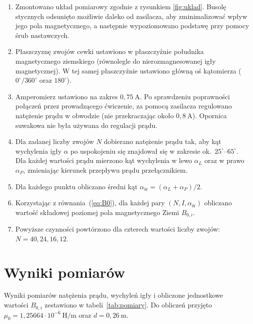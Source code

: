 \documentclass{fizykalab}
\begin{document}
\begin{enumerate}
  \item Zmontowano układ pomiarowy zgodnie z rysunkiem
    \ref{fig:uklad}. Busolę stycznych odsunięto możliwie
    daleko od zasilacza, aby zminimalizować wpływ jego
    pola magnetycznego, a następnie wypoziomowano podstawę
    przy pomocy śrub nastawczych.
  \item Płaszczyznę zwojów cewki ustawiono w płaszczyźnie
    południka magnetycznego ziemskiego (równolegle do
    nierozmagnesowanej igły magnetycznej). W tej samej
    płaszczyźnie ustawiono główną oś kątomierza
    (\(0^\circ/360^\circ\) oraz \(180^\circ\)).
  \item Amperomierz ustawiono na zakres \(0{,}75~\text{A}\).
    Po sprawdzeniu poprawności połączeń przez prowadzącego
    ćwiczenie, za pomocą zasilacza regulowano natężenie
    prądu w obwodzie (nie przekraczając około \(0{,}8~\text{A}\)).
    Opornica suwakowa nie była używana do regulacji prądu.
  \item Dla zadanej liczby zwojów \(N\) dobierano natężenie
    prądu tak, aby kąt wychylenia igły \(\alpha\) po
    uspokojeniu się znajdował się w zakresie
    ok.~\(25^\circ\)–\(65^\circ\). Dla każdej wartości prądu
    mierzono kąt wychylenia w lewo \(\alpha_L\) oraz w prawo
    \(\alpha_P\), zmieniając kierunek przepływu prądu
    przełącznikiem.
  \item Dla każdego punktu obliczano średni kąt
    \(\alpha_{\text{śr}} = (\alpha_L + \alpha_P)/2\).
  \item Korzystając z równania~(\ref{eq:B0}), dla każdej pary
    \((N, I, \alpha_{\text{śr}})\) obliczano wartość
    składowej poziomej pola magnetycznego Ziemi \(B_{0,i}\).
  \item Powyższe czynności powtórzono dla czterech wartości
    liczby zwojów: \(N = 40, 24, 16, 12\).
\end{enumerate}

\section{Wyniki pomiarów}

Wyniki pomiarów natężenia prądu, wychyleń igły i obliczone
jednostkowe wartości \(B_{0,i}\) zestawiono w
tabeli~\ref{tab:pomiary}. Do obliczeń przyjęto
\(\mu_0 = 1{,}25664\cdot 10^{-6}~\text{H/m}\) oraz
\(d = 0{,}26~\text{m}\).
\end{document}
